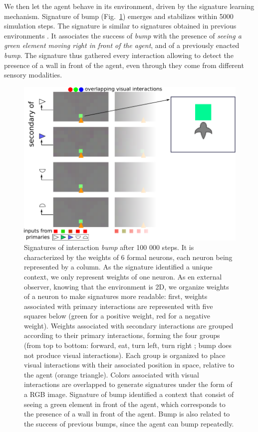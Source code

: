 \documentclass[conference]{IEEEtran}
\makeatletter
\let\cite\relax
\DeclareRobustCommand{\cite}{%
	\let\new@cite@pre\@gobble
	\@ifnextchar[\new@cite{\@citex[]}}
\def\new@cite[#1]{\@ifnextchar[{\new@citea{#1}}{\@citex[#1]}}
\def\new@citea#1{\def\new@cite@pre{#1}\@citex}
\makeatother
\begin{document}
We then let the agent behave in its environment, driven by the signature learning mechanism. 
Signature of bump (Fig.~\ref{fig:bump}) emerges and stabilizes within 5000 simulation steps. 
The signature is similar to signatures obtained in previous environments \cite{gay:space}\cite{gay:dynamic}.
It associates the success of \textit{bump} with the presence of \textit{seeing a green element moving right in front of the agent}, and of a previously enacted \textit{bump}. 
The signature thus gathered every interaction allowing to detect the presence of a wall in front of the agent, even through they come from different sensory modalities.

\begin{figure}[ht]
\centerline{\includegraphics[scale=0.35]{img/Signatures1_5.pdf}}
\caption{Signatures of interaction \textit{bump} after 100 000 steps. 
It is characterized by the weights of 6 formal neurons, each neuron being represented by a column. 
As the signature identified a unique context, we only represent weights of one neuron. 
As en external observer, knowing that the environment is 2D, we organize weights of a neuron to make signatures more readable: first, weights associated with primary interactions are represented with five squares below (green for a positive weight, red for a negative weight). 
Weights associated with secondary interactions are grouped according to their primary interactions, forming the four groups (from top to bottom: forward, eat, turn left, turn right ; bump does not produce visual interactions). 
Each group is organized to place visual interactions with their associated position in space, relative to the agent (orange triangle). 
Colors associated with visual interactions are overlapped to generate signatures under the form of a RGB image. 
Signature of bump identified a context that consist of seeing a green element in front of the agent, which corresponds to the presence of a wall in front of the agent. 
Bump is also related to the success of previous bumps, since the agent can bump repeatedly.
}
\label{fig:bump}
\end{figure}
\end{document}
